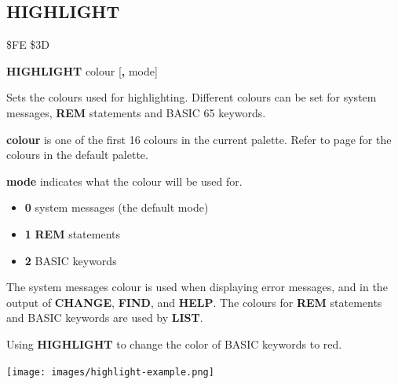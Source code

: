 
\newpage
\subsection{HIGHLIGHT}
\begin{description}[leftmargin=2cm,style=nextline]
\item [Token:] \$FE \$3D
\item [Format:] {\bf HIGHLIGHT} colour [{\bf,} mode]
\item [Usage:] Sets the colours used for highlighting. Different colours can be
                set for system messages, {\bf REM} statements and BASIC 65 keywords.

                {\bf colour} is one of the first 16 colours in the current palette.
                Refer to page \pageref{colourtable} for the colours in the
                default palette.

                {\bf mode} indicates what the colour will be used for.
                \begin{itemize}
                    \item {\bf 0} system messages (the default mode)
                    \item {\bf 1} {\bf REM} statements
                    \item {\bf 2} BASIC keywords
                \end{itemize}

\item [Remarks:] The system messages colour is used when displaying error
                messages, and in the output of {\bf CHANGE}, {\bf FIND}, and
                {\bf HELP}. The colours for {\bf REM} statements and BASIC keywords
                are used by {\bf LIST}.
\item [Example:] Using {\bf HIGHLIGHT} to change the color of BASIC keywords to red.
\item \begin{center}\texttt{[image: images/highlight-example.png]}\end{center}
\end{description}


\newpage
